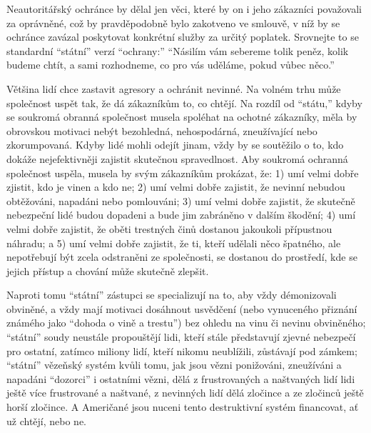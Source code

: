 \documentclass{book}
\begin{document}
Neautoritářský ochránce by dělal jen věci, které by on i jeho zákazníci považovali za oprávněné, což by pravděpodobně bylo zakotveno ve smlouvě, v níž by se ochránce zavázal poskytovat konkrétní služby za určitý poplatek. Srovnejte to se standardní \enquote{státní} verzí \enquote{ochrany:} \enquote{Násilím vám sebereme tolik peněz, kolik budeme chtít, a sami rozhodneme, co pro vás uděláme, pokud vůbec něco.}

Většina lidí chce zastavit agresory a ochránit nevinné. Na volném trhu může společnost uspět tak, že dá zákazníkům to, co chtějí. Na rozdíl od \enquote{státu,} kdyby se soukromá obranná společnost musela spoléhat na ochotné zákazníky, měla by obrovskou motivaci nebýt bezohledná, nehospodárná, zneužívající nebo zkorumpovaná. Kdyby lidé mohli odejít jinam, vždy by se soutěžilo o to, kdo dokáže nejefektivněji zajistit skutečnou spravedlnost. Aby soukromá ochranná společnost uspěla, musela by svým zákazníkům prokázat, že: 1) umí velmi dobře zjistit, kdo je vinen a kdo ne; 2) umí velmi dobře zajistit, že nevinní nebudou obtěžováni, napadáni nebo pomlouváni; 3) umí velmi dobře zajistit, že skutečně nebezpeční lidé budou dopadeni a bude jim zabráněno v dalším škodění; 4) umí velmi dobře zajistit, že oběti trestných činů dostanou jakoukoli přípustnou náhradu; a 5) umí velmi dobře zajistit, že ti, kteří udělali něco špatného, ale nepotřebují být zcela odstraněni ze společnosti, se dostanou do prostředí, kde se jejich přístup a chování může skutečně zlepšit.

Naproti tomu \enquote{státní} zástupci se specializují na to, aby vždy démonizovali obviněné, a vždy mají motivaci dosáhnout usvědčení (nebo vynuceného přiznání známého jako \enquote{dohoda o vině a trestu}) bez ohledu na vinu či nevinu obviněného; \enquote{státní} soudy neustále propouštějí lidi, kteří stále představují zjevné nebezpečí pro ostatní, zatímco miliony lidí, kteří nikomu neublížili, zůstávají pod zámkem; \enquote{státní} vězeňský systém kvůli tomu, jak jsou vězni ponižováni, zneužíváni a napadáni \enquote{dozorci} i ostatními vězni, dělá z frustrovaných a naštvaných lidí lidi ještě více frustrované a naštvané, z nevinných lidí dělá zločince a ze zločinců ještě horší zločince. A Američané jsou nuceni tento destruktivní systém financovat, ať už chtějí, nebo ne.
\end{document}
